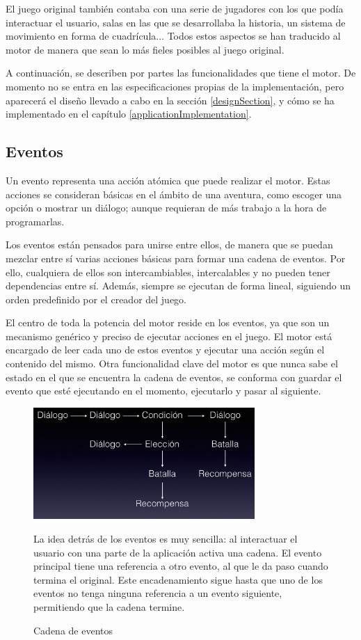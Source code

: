 El juego original también contaba con una serie de jugadores con los que podía interactuar el usuario, salas en las que se desarrollaba la historia, un sistema de movimiento en forma de cuadrícula... Todos estos aspectos se han traducido al motor de manera que sean lo más fieles posibles al juego original.

A continuación, se describen por partes las funcionalidades que tiene el motor. De momento no se entra en las especificaciones propias de la implementación, pero aparecerá el diseño llevado a cabo en la sección \ref{designSection}, y cómo se ha implementado en el capítulo \ref{applicationImplementation}.

\subsection{Eventos}
Un evento representa una acción atómica que puede realizar el motor. Estas acciones se consideran básicas en el ámbito de una aventura, como escoger una opción o mostrar un diálogo; aunque requieran de más trabajo a la hora de programarlas.

Los eventos están pensados para unirse entre ellos, de manera que se puedan mezclar entre sí varias acciones básicas para formar una cadena de eventos. Por ello, cualquiera de ellos son intercambiables, intercalables y no pueden tener dependencias entre sí.
Además, siempre se ejecutan de forma lineal, siguiendo un orden predefinido por el creador del juego.

El centro de toda la potencia del motor reside en los eventos, ya que son un mecanismo genérico y preciso de ejecutar acciones en el juego. El motor está encargado de leer cada uno de estos eventos y ejecutar una acción según el contenido del mismo.
Otra funcionalidad clave del motor es que nunca sabe el estado en el que se encuentra la cadena de eventos, se conforma con guardar el evento que esté ejecutando en el momento, ejecutarlo y pasar al siguiente.

\begin{figure}[h]
	\caption{Cadena de eventos}
	\centering
	\includegraphics[width=0.75\textwidth]{include/eventsChainExample.jpg}
	
	La idea detrás de los eventos es muy sencilla: al interactuar el usuario con una parte de la aplicación activa una cadena. El evento principal tiene una referencia a otro evento, al que le da paso cuando termina el original. Este encadenamiento sigue hasta que uno de los eventos no tenga ninguna referencia a un evento siguiente, permitiendo que la cadena termine.
\end{figure}

